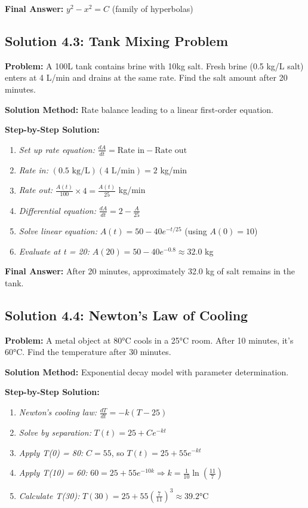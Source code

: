 \documentclass[12pt, letterpaper]{book}
\theoremstyle{problemstyle}
\theoremstyle{solutionstyle}
\begin{document}
\textbf{Final Answer:} $y^2 - x^2 = C$ (family of hyperbolas)

\subsection{Solution 4.3: Tank Mixing Problem}

\textbf{Problem:} A 100L tank contains brine with 10kg salt. Fresh brine (0.5 kg/L salt) enters at 4 L/min and drains at the same rate. Find the salt amount after 20 minutes.

\textbf{Solution Method:} Rate balance leading to a linear first-order equation.

\textbf{Step-by-Step Solution:}
\begin{enumerate}
    \item \textit{Set up rate equation:} $\frac{dA}{dt} = \text{Rate in} - \text{Rate out}$
    \item \textit{Rate in:} $(0.5 \text{ kg/L})(4 \text{ L/min}) = 2$ kg/min
    \item \textit{Rate out:} $\frac{A(t)}{100} \times 4 = \frac{A(t)}{25}$ kg/min
    \item \textit{Differential equation:} $\frac{dA}{dt} = 2 - \frac{A}{25}$
    \item \textit{Solve linear equation:} $A(t) = 50 - 40e^{-t/25}$ (using $A(0) = 10$)
    \item \textit{Evaluate at t = 20:} $A(20) = 50 - 40e^{-0.8} \approx 32.0$ kg
\end{enumerate}

\textbf{Final Answer:} After 20 minutes, approximately 32.0 kg of salt remains in the tank.

\subsection{Solution 4.4: Newton's Law of Cooling}

\textbf{Problem:} A metal object at 80°C cools in a 25°C room. After 10 minutes, it's 60°C. Find the temperature after 30 minutes.

\textbf{Solution Method:} Exponential decay model with parameter determination.

\textbf{Step-by-Step Solution:}
\begin{enumerate}
    \item \textit{Newton's cooling law:} $\frac{dT}{dt} = -k(T - 25)$
    \item \textit{Solve by separation:} $T(t) = 25 + Ce^{-kt}$
    \item \textit{Apply T(0) = 80:} $C = 55$, so $T(t) = 25 + 55e^{-kt}$
    \item \textit{Apply T(10) = 60:} $60 = 25 + 55e^{-10k} \Rightarrow k = \frac{1}{10}\ln\left(\frac{11}{7}\right)$
    \item \textit{Calculate T(30):} $T(30) = 25 + 55\left(\frac{7}{11}\right)^3 \approx 39.2°$C
\end{enumerate}
\end{document}
